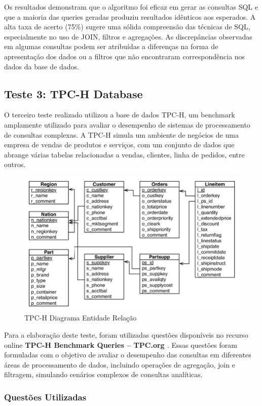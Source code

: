 \documentclass{article}
\begin{document}
Os resultados demonstram que o algoritmo foi eficaz em gerar as consultas SQL e que a maioria das queries geradas produziu resultados idênticos aos esperados. A alta taxa de acerto (75\%) sugere uma sólida compreensão das técnicas de SQL, especialmente no uso de JOIN, filtros e agregações.
As discrepâncias observadas em algumas consultas podem ser atribuídas a diferenças na forma de apresentação dos dados ou a filtros que não encontraram correspondência nos dados da base de dados.

\subsection{Teste 3: TPC-H Database}

\hspace*{1em} O terceiro teste realizado utilizou a base de dados TPC-H, um benchmark amplamente utilizado para avaliar o desempenho de sistemas de processamento de consultas complexas. A TPC-H simula um ambiente de negócios de uma empresa de vendas de produtos e serviços, com um conjunto de dados que abrange várias tabelas relacionadas a vendas, clientes, linha de pedidos, entre outros.


\begin{figure}
    \centering
    \includegraphics[width=0.5\linewidth]{image.png}
    \caption{TPC-H Diagrama Entidade Relação}
    \label{fig:enter-label}
\end{figure}

Para a elaboração deste teste, foram utilizadas questões disponíveis no recurso online \textbf{TPC-H Benchmark Queries – TPC.org \cite{tpc-h}}. Essas questões foram formuladas com o objetivo de avaliar o desempenho das consultas em diferentes áreas de processamento de dados, incluindo operações de agregação, join e filtragem, simulando cenários complexos de consultas analíticas.

\subsubsection{Questões Utilizadas}
\end{document}
